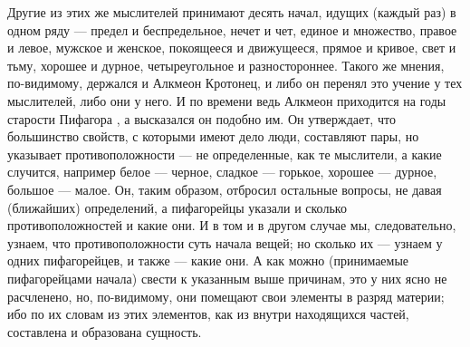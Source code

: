 \documentclass{article}
\begin{document}
Другие из этих же мыслителей принимают десять начал, идущих (каждый раз) в одном ряду — предел и беспредельное, нечет и чет, единое и множество, правое и левое, мужское и женское, покоящееся и движущееся, прямое и кривое, свет и тьму, хорошее и дурное, четыреугольное и разностороннее.
\footnotemark[7]
Такого же мнения, по-видимому, держался и Алкмеон Кротонец, и либо он перенял это учение у тех мыслителей, либо они у него. И по времени ведь Алкмеон приходится на годы старости Пифагора
\footnotemark[8]
, а высказался он подобно им. Он утверждает, что большинство свойств, с которыми имеют дело люди, составляют пары, но указывает противоположности — не определенные, как те мыслители, а какие случится, например белое — черное, сладкое — горькое, хорошее — дурное, большое — малое. Он, таким образом, отбросил остальные вопросы, не давая (ближайших) определений, а пифагорейцы указали и сколько противоположностей и какие они. И в том и в другом случае мы, следовательно, узнаем, что противоположности суть начала вещей; но сколько их — узнаем у одних пифагорейцев, и также — какие они. А как можно (принимаемые пифагорейцами начала) свести к указанным выше причинам, это у них ясно не расчленено, но, по-видимому, они помещают свои элементы в разряд материи; ибо по их словам из этих элементов, как из внутри находящихся
\footnotemark[9]
частей, составлена и образована сущность.
\end{document}
